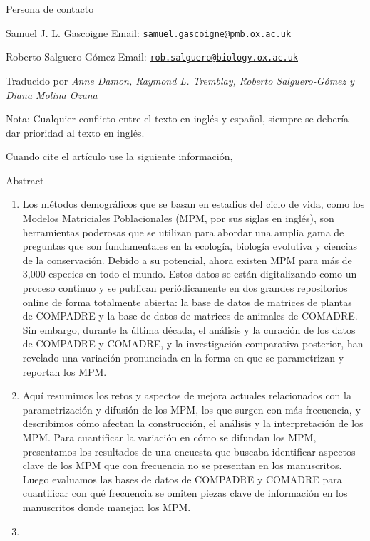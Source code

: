 \documentclass[
]{book}
\theoremstyle{definition}
\theoremstyle{definition}
\theoremstyle{definition}
\theoremstyle{definition}
\theoremstyle{remark}
\begin{document}
Persona de contacto

Samuel J. L. Gascoigne Email: \href{mailto:samuel.gascoigne@pmb.ox.ac.uk}{\nolinkurl{samuel.gascoigne@pmb.ox.ac.uk}}

Roberto Salguero-Gómez Email: \href{mailto:rob.salguero@biology.ox.ac.uk}{\nolinkurl{rob.salguero@biology.ox.ac.uk}}

Traducido por \emph{Anne Damon, Raymond L. Tremblay, Roberto Salguero-Gómez y Diana Molina Ozuna}

Nota: Cualquier conflicto entre el texto en inglés y español, siempre se debería dar prioridad al texto en inglés.

Cuando cite el artículo use la siguiente información, \citep{gascoigne2023standard}

Abstract

\begin{enumerate}
\def\labelenumi{\arabic{enumi}.}
\item
  Los métodos demográficos que se basan en estadios del ciclo de vida, como los Modelos Matriciales Poblacionales (MPM, por sus siglas en inglés), son herramientas poderosas que se utilizan para abordar una amplia gama de preguntas que son fundamentales en la ecología, biología evolutiva y ciencias de la conservación. Debido a su potencial, ahora existen MPM para más de 3,000 especies en todo el mundo. Estos datos se están digitalizando como un proceso continuo y se publican periódicamente en dos grandes repositorios online de forma totalmente abierta: la base de datos de matrices de plantas de COMPADRE y la base de datos de matrices de animales de COMADRE. Sin embargo, durante la última década, el análisis y la curación de los datos de COMPADRE y COMADRE, y la investigación comparativa posterior, han revelado una variación pronunciada en la forma en que se parametrizan y reportan los MPM.
\item
  Aquí resumimos los retos y aspectos de mejora actuales relacionados con la parametrización y difusión de los MPM, los que surgen con más frecuencia, y describimos cómo afectan la construcción, el análisis y la interpretación de los MPM. Para cuantificar la variación en cómo se difundan los MPM, presentamos los resultados de una encuesta que buscaba identificar aspectos clave de los MPM que con frecuencia no se presentan en los manuscritos. Luego evaluamos las bases de datos de COMPADRE y COMADRE para cuantificar con qué frecuencia se omiten piezas clave de información en los manuscritos donde manejan los MPM.
\item

\end{enumerate}
\end{document}
